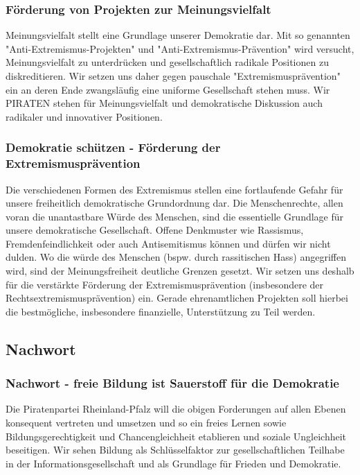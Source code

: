 \subsubsection{Förderung von Projekten zur Meinungsvielfalt}
\abstimmung
Meinungsvielfalt stellt eine Grundlage unserer Demokratie dar. Mit so genannten "Anti-Extremismus-Projekten" und "Anti-Extremismus-Prävention" wird versucht, Meinungsvielfalt zu unterdrücken und gesellschaftlich radikale Positionen zu diskreditieren. Wir setzen uns daher gegen pauschale "Extremismusprävention" ein an deren Ende zwangsläufig eine uniforme Gesellschaft stehen muss. Wir PIRATEN stehen für Meinungsvielfalt und demokratische Diskussion auch radikaler und innovativer Positionen.
 
\label{wp:bildung:demokratie}

\subsubsection{Demokratie schützen - Förderung der Extremismusprävention}
\abstimmung
Die verschiedenen Formen des Extremismus stellen eine fortlaufende Gefahr für unsere freiheitlich demokratische Grundordnung dar. Die Menschenrechte, allen voran die unantastbare Würde des Menschen, sind die essentielle Grundlage für unsere demokratische Gesellschaft. Offene Denkmuster wie Rassismus, Fremdenfeindlichkeit oder auch Antisemitismus können und dürfen wir nicht dulden. Wo die würde des Menschen (bspw. durch rassitischen Hass) angegriffen wird, sind der Meinungsfreiheit deutliche Grenzen gesetzt. Wir setzen uns deshalb für die verstärkte Förderung der Extremismusprävention (insbesondere der Rechtsextremismusprävention) ein. Gerade ehrenamtlichen Projekten soll hierbei die bestmögliche, insbesondere finanzielle, Unterstützung zu Teil werden.
 
\subsection*{Nachwort}
\subsubsection{Nachwort - freie Bildung ist Sauerstoff für die Demokratie}
\abstimmung
Die Piratenpartei Rheinland-Pfalz will die obigen Forderungen auf allen Ebenen konsequent vertreten und umsetzen und so ein freies Lernen sowie Bildungsgerechtigkeit und Chancengleichheit etablieren und soziale Ungleichheit beseitigen. Wir sehen Bildung als Schlüsselfaktor zur gesellschaftlichen Teilhabe in der Informationsgesellschaft und als Grundlage für Frieden und Demokratie.
